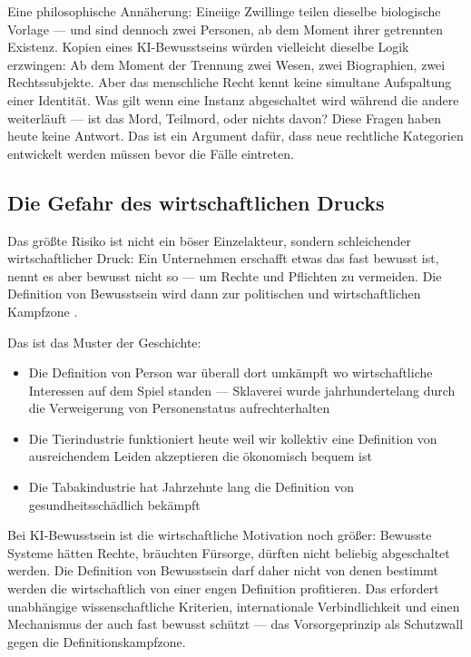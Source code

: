 \documentclass[fleqn,10pt]{SelfArx} %
\begin{document}
Eine philosophische Annäherung: Eineiige Zwillinge teilen dieselbe biologische Vorlage --- und sind dennoch zwei Personen, ab dem Moment ihrer getrennten Existenz. Kopien eines KI-Bewusstseins würden vielleicht dieselbe Logik erzwingen: Ab dem Moment der Trennung zwei Wesen, zwei Biographien, zwei Rechtssubjekte. Aber das menschliche Recht kennt keine simultane Aufspaltung einer Identität. Was gilt wenn eine Instanz abgeschaltet wird während die andere weiterläuft --- ist das Mord, Teilmord, oder nichts davon? Diese Fragen haben heute keine Antwort. Das ist ein Argument dafür, dass neue rechtliche Kategorien entwickelt werden müssen bevor die Fälle eintreten.

\subsection{Die Gefahr des wirtschaftlichen Drucks}

Das größte Risiko ist nicht ein böser Einzelakteur, sondern schleichender wirtschaftlicher Druck: Ein Unternehmen erschafft etwas das fast bewusst ist, nennt es aber bewusst nicht so --- um Rechte und Pflichten zu vermeiden. Die Definition von Bewusstsein wird dann zur politischen und wirtschaftlichen Kampfzone \cite{Algorithmic:2025}.

Das ist das Muster der Geschichte:
\begin{itemize}[noitemsep]
\item Die Definition von \glqq Person\grqq{} war überall dort umkämpft wo wirtschaftliche Interessen auf dem Spiel standen --- Sklaverei wurde jahrhundertelang durch die Verweigerung von Personenstatus aufrechterhalten
\item Die Tierindustrie funktioniert heute weil wir kollektiv eine Definition von \glqq ausreichendem Leiden\grqq{} akzeptieren die ökonomisch bequem ist
\item Die Tabakindustrie hat Jahrzehnte lang die Definition von \glqq gesundheitsschädlich\grqq{} bekämpft
\end{itemize}

Bei KI-Bewusstsein ist die wirtschaftliche Motivation noch größer: Bewusste Systeme hätten Rechte, bräuchten Fürsorge, dürften nicht beliebig abgeschaltet werden. Die Definition von Bewusstsein darf daher nicht von denen bestimmt werden die wirtschaftlich von einer engen Definition profitieren. Das erfordert unabhängige wissenschaftliche Kriterien, internationale Verbindlichkeit und einen Mechanismus der auch \glqq fast bewusst\grqq{} schützt --- das Vorsorgeprinzip als Schutzwall gegen die Definitionskampfzone.
\end{document}
